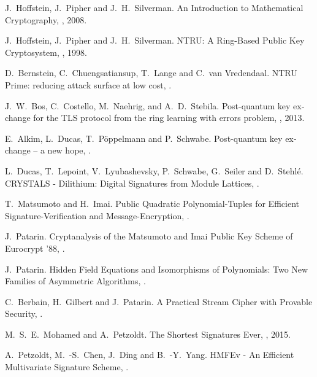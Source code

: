 \documentclass[a4paper,11pt]{article}
\begin{document}
\begin{otherlanguage}{english}
\begin{multicols}{2}
\begin{thebibliography}{1}
J.~Hoffstein, J.~Pipher and J.~H.~Silverman.
\newblock An Introduction to Mathematical Cryptography,
, 2008.

J.~Hoffstein, J.~Pipher and J.~H.~Silverman.
\newblock NTRU: A Ring-Based Public Key Cryptosystem,
, 1998.

D.~Bernstein, C.~Chuengsatiansup, T.~Lange and C.~van Vredendaal.
\newblock NTRU Prime: reducing attack surface at low cost,
.

J.~W.~Bos, C.~Costello, M.~Naehrig, and A.~D.~Stebila.
\newblock Post-quantum key exchange for the TLS protocol from the ring
learning with errors problem,
, 2013.

E.~Alkim, L.~Ducas, T.~Pöppelmann and P.~Schwabe.
\newblock Post-quantum key exchange – a new hope,
.

L.~Ducas, T.~Lepoint, V.~Lyubashevsky, P.~Schwabe, G.~Seiler and D.~Stehlé.
\newblock CRYSTALS - Dilithium: Digital Signatures from Module Lattices,
.

T.~Matsumoto and H.~Imai.
\newblock Public Quadratic Polynomial-Tuples for Efficient Signature-Verification and Message-Encryption,
.

J.~Patarin.
\newblock Cryptanalysis of the Matsumoto and Imai Public Key Scheme of Eurocrypt '88,
.

J.~Patarin.
\newblock Hidden Field Equations and Isomorphisms of Polynomials: Two New Families of Asymmetric Algorithms,
.

C.~Berbain, H.~Gilbert and J.~Patarin.
\newblock A Practical Stream Cipher with Provable Security,
.

M.~S.~E.~Mohamed and A.~Petzoldt.
\newblock The Shortest Signatures Ever,
, 2015.

A.~Petzoldt, M.~-S.~Chen, J.~Ding and B.~-Y.~Yang.
\newblock HMFEv - An Efficient Multivariate Signature Scheme,
.


\end{thebibliography}
\end{multicols}
\end{otherlanguage}
\end{document}
